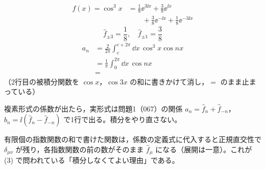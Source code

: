 \begin{align*}
  f(x)=\cos^{3}x&=\frac{1}{8}\ee^{3\ii x}+\frac{3}{8}\ee^{\ii x}\\
  &\qquad+\frac{3}{8}\ee^{-\ii x}+\frac{1}{8}\ee^{-3\ii x}
\end{align*}
\[ \hat{f}_{\pm3}=\frac{1}{8},\quad \hat{f}_{\pm1}=\frac{3}{8} \]
\begin{align*}
  a_n&=\frac{2}{2\pi}\int_{c}^{c+2\pi}\dd x\,\cos^{3}x\cos nx\\
  &=\frac{1}{\pi}\int_{0}^{2\pi}\dd x\,\cos nx\\
  &=
\end{align*}
（2行目の被積分関数を $\cos x$，$\cos3x$ の和に書きかけて消し，$=$ のまま止まっている）
\mikai
{}
\mikai
\item 複素形式の係数が出たら，実形式は問題1（067）の関係 $a_n=\hat{f}_n+\hat{f}_{-n}$，$b_n=\ii(\hat{f}_n-\hat{f}_{-n})$ で1行で出る。積分をやり直さない。
\item 有限個の指数関数の和で書けた関数は，係数の定義式に代入すると正規直交性で $\delta_{\mu\nu}$ が残り，各指数関数の前の数がそのまま $\hat{f}_{\mu}$ になる（展開は一意）。これが (3) で問われている「積分しなくてよい理由」である。
